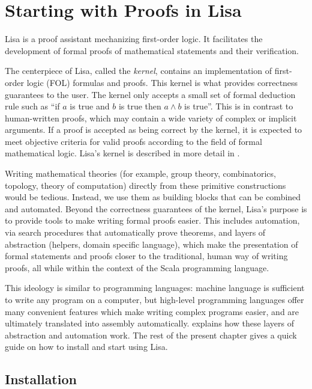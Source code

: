 \chapter{Starting with Proofs in Lisa}
\label{chapt:quickguide}
Lisa is a proof assistant mechanizing first-order logic. It facilitates the
development of formal proofs of mathematical statements and their verification.

The centerpiece of Lisa, called the \emph{kernel}, contains an implementation of
first-order logic (FOL) formulas and proofs. This kernel is what provides
correctness guarantees to the user. The kernel only accepts a small set of
formal deduction rule such as ``if $a$ is true and $b$ is true then $a\land b$
is true''. This is in contrast to human-written proofs, which may contain a wide
variety of complex or implicit arguments. If a proof is accepted as being
correct by the kernel, it is expected to meet objective criteria for valid
proofs according to the field of formal mathematical logic.
%
%
Lisa's kernel is described in more detail in
.

Writing mathematical theories (for example, group theory, combinatorics,
topology, theory of computation) directly from these primitive constructions
would be tedious. Instead, we use them as building blocks that can be combined
and automated. Beyond the correctness guarantees of the kernel, Lisa's purpose
is to provide tools to make writing formal proofs easier. This includes
automation, via search procedures that automatically prove theorems, and layers
of abstraction (helpers, domain specific language), which make the presentation
of formal statements and proofs closer to the traditional, human way of writing
proofs, all while within the context of the Scala programming language.

This ideology is similar to programming languages: machine language is
sufficient to write any program on a computer, but high-level programming
languages offer many convenient features which make writing complex programs
easier, and are ultimately translated into assembly automatically.
 explains how these layers of abstraction and automation
work. The rest of the present chapter gives a quick guide on how to install and
start using Lisa.

\section{Installation}

